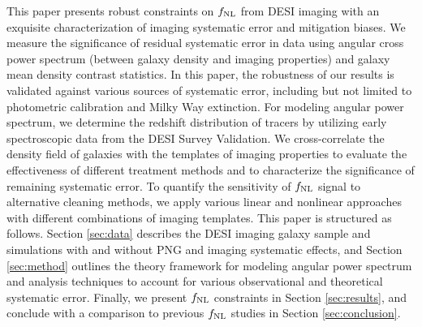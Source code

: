 This paper presents robust constraints on $f_{\rm NL}$ from DESI imaging with an exquisite characterization of imaging systematic error and mitigation biases. We measure the significance of residual systematic error in data using angular cross power spectrum (between galaxy density and imaging properties) and galaxy mean density contrast statistics. In this paper, the robustness of our results is validated against various sources of systematic error, including but not limited to photometric calibration and Milky Way extinction. For modeling angular power spectrum, we determine the redshift distribution of tracers by utilizing early spectroscopic data from the DESI Survey Validation. We cross-correlate the density field of galaxies with the templates of imaging properties to evaluate the effectiveness of different treatment methods and to characterize the significance of remaining systematic error. To quantify the sensitivity of $f_{\rm NL}$ signal to alternative cleaning methods, we apply various linear and nonlinear approaches with different combinations of imaging templates. This paper is structured as follows. Section \ref{sec:data} describes the DESI imaging galaxy sample and simulations with and without PNG and imaging systematic effects, and Section \ref{sec:method} outlines the theory framework for modeling angular power spectrum and analysis techniques to account for various observational and theoretical systematic error. Finally, we present $f_{\rm NL}$ constraints in Section \ref{sec:results}, and conclude with a comparison to previous $f_{\rm NL}$ studies in Section \ref{sec:conclusion}.